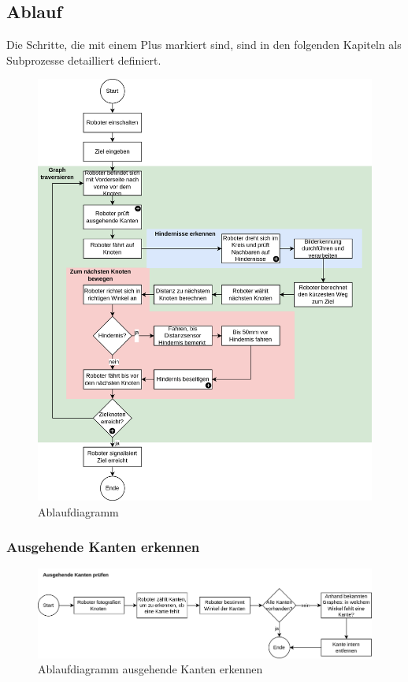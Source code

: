 \subsection{Ablauf}

Die Schritte, die mit einem Plus markiert sind, sind in den folgenden Kapiteln als Subprozesse detailliert definiert.

\begin{figure}[H]
\centering
\includegraphics[width=\textwidth]{assets/gesamtkonzept/ablaufdiagramm.png}
\caption{Ablaufdiagramm}
\label{fig:ablaufdiagramm}
\end{figure}





\subsubsection{Ausgehende Kanten erkennen}

\begin{figure}[H]
\centering
\includegraphics[width=\textwidth]{assets/gesamtkonzept/ablaufdiagramm-kanten-erkennen.png}
\caption{Ablaufdiagramm ausgehende Kanten erkennen}
\label{fig:ablaufdiagramm-kanten-erkennen}
\end{figure}


